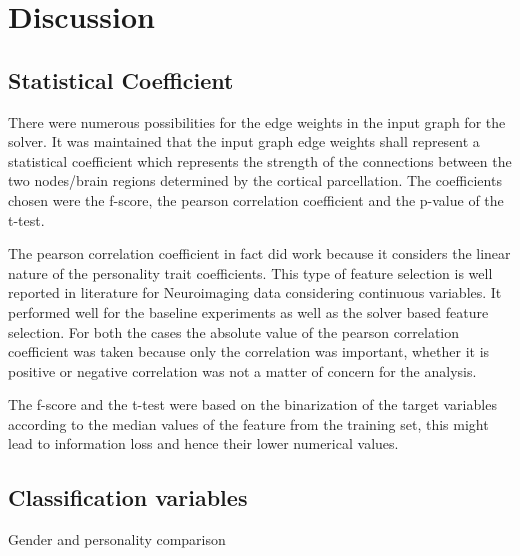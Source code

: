 \documentclass[msthesis.tex]{subfiles}
\begin{document}
\chapter{Discussion}
\section{Statistical Coefficient}
There were numerous possibilities for the edge weights in the input graph for the solver. It was maintained that the input graph edge weights shall represent a statistical coefficient which represents the strength of the connections between the two nodes/brain regions determined by the cortical parcellation. The coefficients chosen were the f-score, the pearson correlation coefficient and the p-value of the t-test. 

The pearson correlation coefficient in fact did work because it considers the linear nature of the personality trait coefficients. This type of feature selection is well reported in literature for Neuroimaging data considering continuous variables. It performed well for the baseline experiments as well as the solver based feature selection. For both the cases the absolute value of the pearson correlation coefficient was taken because only the correlation was important, whether it is positive or negative correlation was not a matter of concern for the analysis.

The f-score and the t-test were based on the binarization of the target variables according to the median values of the feature from the training set, this might lead to information loss and hence their lower numerical values. 

\section{Classification variables}
Gender and personality comparison

\section{}
\end{document}
